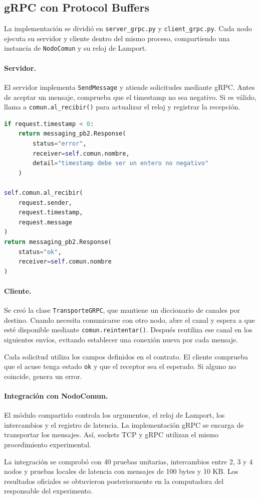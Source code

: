 
\subsection{gRPC con Protocol Buffers}

La implementación se dividió en \texttt{server\_grpc.py} y \texttt{client\_grpc.py}. Cada nodo ejecuta su servidor y cliente dentro del mismo proceso, compartiendo una instancia de \texttt{NodoComun} y su reloj de Lamport.

\paragraph{Servidor.}
El servidor implementa \texttt{SendMessage} y atiende solicitudes mediante gRPC. Antes de aceptar un mensaje, comprueba que el timestamp no sea negativo. Si es válido, llama a \texttt{comun.al\_recibir()} para actualizar el reloj y registrar la recepción.

\begin{lstlisting}[language=Python]
if request.timestamp < 0:
    return messaging_pb2.Response(
        status="error",
        receiver=self.comun.nombre,
        detail="timestamp debe ser un entero no negativo"
    )

self.comun.al_recibir(
    request.sender,
    request.timestamp,
    request.message
)
return messaging_pb2.Response(
    status="ok",
    receiver=self.comun.nombre
)
\end{lstlisting}

\paragraph{Cliente.}
Se creó la clase \texttt{TransporteGRPC}, que mantiene un diccionario de canales por destino. Cuando necesita comunicarse con otro nodo, abre el canal y espera a que esté disponible mediante \texttt{comun.reintentar()}. Después reutiliza ese canal en los siguientes envíos, evitando establecer una conexión nueva por cada mensaje.

Cada solicitud utiliza los campos definidos en el contrato. El cliente comprueba que el acuse tenga estado \texttt{ok} y que el receptor sea el esperado. Si alguno no coincide, genera un error.

\paragraph{Integración con NodoComun.}
El módulo compartido controla los argumentos, el reloj de Lamport, los intercambios y el registro de latencia. La implementación gRPC se encarga de transportar los mensajes. Así, sockets TCP y gRPC utilizan el mismo procedimiento experimental.

La integración se comprobó con 40 pruebas unitarias, intercambios entre 2, 3 y 4 nodos y pruebas locales de latencia con mensajes de 100 bytes y 10 KB. Los resultados oficiales se obtuvieron posteriormente en la computadora del responsable del experimento.

